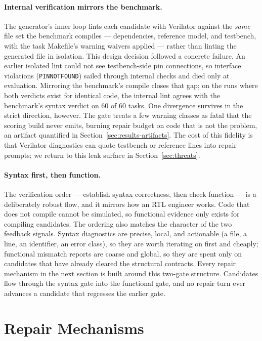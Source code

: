 \paragraph{Internal verification mirrors the benchmark.}
The generator's inner loop lints each candidate with Verilator against the
\emph{same} file set the benchmark compiles --- dependencies, reference
model, and testbench, with the task Makefile's warning waivers applied ---
rather than linting the generated file in isolation. This design decision
followed a concrete failure. An earlier isolated lint could not see
testbench-side pin connections, so interface violations
(\texttt{PINNOTFOUND}) sailed through internal checks and died only at
evaluation. Mirroring the benchmark's compile closes that gap; on the runs
where both verdicts exist for identical code, the internal lint agrees with
the benchmark's syntax verdict on 60 of 60 tasks. One divergence survives
in the strict direction, however. The gate treats a few warning classes as
fatal that the scoring build never emits, burning repair budget on code
that is not the problem, an artifact quantified in
Section~\ref{sec:results-artifacts}. The cost of this fidelity
is that Verilator diagnostics can quote testbench or reference lines into
repair prompts; we return to this leak surface in
Section~\ref{sec:threats}.

\paragraph{Syntax first, then function.}
The verification order --- establish syntax correctness, then check
function --- is a deliberately robust flow, and it mirrors how an RTL
engineer works. Code that does not compile cannot be simulated, so
functional evidence only exists for compiling candidates. The ordering
also matches the character of the two feedback signals. Syntax
diagnostics are precise, local, and actionable (a file, a line, an
identifier, an error class), so they are worth iterating on first and
cheaply; functional mismatch reports are coarse and global, so they are
spent only on candidates that have already cleared the structural
contracts. Every repair mechanism in the next section is built around
this two-gate structure. Candidates flow through the syntax gate into
the functional gate, and no repair turn ever advances a candidate that
regresses the earlier gate.

\section{Repair Mechanisms}
\label{sec:pipeline-repair}

